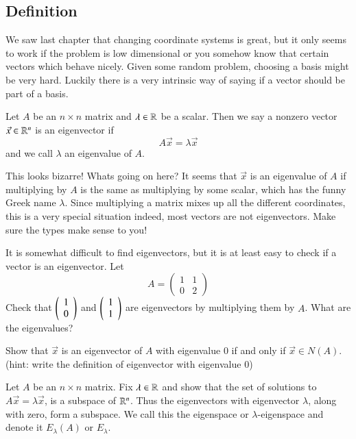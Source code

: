 \documentclass[Main.tex]{subfiles}
\begin{document}
\subsection{Definition}
We saw last chapter that changing coordinate systems is great, but it only seems to work if the problem is low dimensional or you somehow know that certain vectors which behave nicely.
Given some random problem, choosing a basis might be very hard.
Luckily there is a very intrinsic way of saying if a vector should be part of a basis.
\begin{Def}
  Let $A$ be an $n\times n$ matrix and $\lambda\in \mathbb{R}$ be a scalar.
  Then we say a nonzero vector $\vec{x}\in \mathbb{R}^n$ is an eigenvector if
  \[A\vec{x}=\lambda\vec{x}\]
  and we call $\lambda$ an eigenvalue of $A$.
\end{Def}
\begin{Remark}
  This looks bizarre!
  Whats going on here?
  It seems that $\vec{x}$ is an eigenvalue of $A$ if multiplying by $A$ is the same as multiplying by some scalar, which has the funny Greek name $\lambda$.
  Since multiplying a matrix mixes up all the different coordinates, this is a very special situation indeed, most vectors are not eigenvectors.
  Make sure the types make sense to you!
\end{Remark}
\begin{EasyEx}
  It is somewhat difficult to find eigenvectors, but it is at least easy to check if a vector is an eigenvector.
  Let
  \[A=\left(\begin{array}{cc} 1 & 1 \\ 0 & 2\end{array}\right)\]
  Check that $\left(\begin{array}{c}1\\0\end{array}\right)$ and $\left(\begin{array}{c}1\\1\end{array}\right)$ are eigenvectors by multiplying them by $A$.  
  What are the eigenvalues?
\end{EasyEx}
\begin{EasyEx}
  Show that $\vec{x}$ is an eigenvector of $A$ with eigenvalue 0 if and only if $\vec{x}\in N(A)$.
  (hint: write the definition of eigenvector with eigenvalue 0)
\end{EasyEx}
\begin{Ex}[Eigenspace]
  Let $A$ be an $n\times n$ matrix.  
  Fix $\lambda\in \mathbb{R}$ and show that the set of solutions to $A\vec{x}=\lambda\vec{x}$, is a subspace of $\mathbb{R}^n$.
  Thus the eigenvectors with eigenvector $\lambda$, along with zero, form a subspace.
  We call this the eigenspace or $\lambda$-eigenspace and denote it $E_\lambda(A)$ or $E_\lambda$.
\end{Ex}
\end{document}

